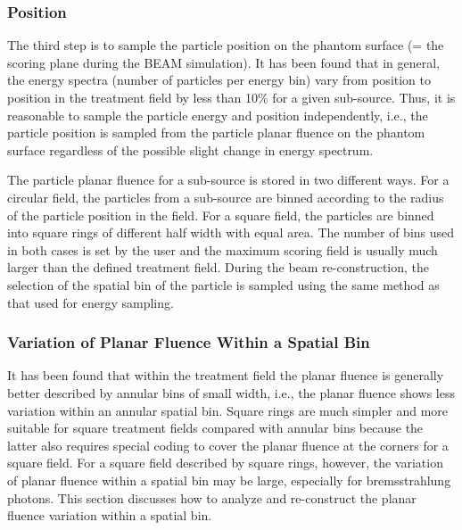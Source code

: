\documentclass[12pt,twoside]{article}
\begin{document}
\subsubsection{Position}
The third step is to sample the particle position on the phantom surface
(= the scoring plane during the BEAM simulation).  It has been found that
in general,  the energy spectra (number of particles per energy bin) vary
from position to position in the treatment field by less than 10\% for a
given sub-source. Thus, it is reasonable to sample the particle energy and
position independently, i.e., the particle position is sampled from the
particle planar fluence on the phantom surface regardless of the possible
slight change in energy spectrum.

The particle planar fluence for a sub-source is stored in two different
ways. For a circular field, the particles from a sub-source are binned
according to the radius of the particle position in the field.  For a
square field, the particles are binned into square rings of different half
width with equal area.  The number of bins used in both cases is set by
the user and the maximum scoring field is usually much larger than the
defined treatment field. During the beam re-construction, the selection of
the spatial bin of the particle is sampled using the same method as that
used for energy sampling.

\subsubsection{Variation of Planar Fluence Within a Spatial Bin}
It has been found that within the treatment field the planar fluence is
generally better described by annular bins of small width, i.e., the
planar fluence shows less variation within an annular spatial bin. Square
rings are much simpler and more suitable for square treatment fields
compared with annular bins because the latter also requires special coding
to cover the planar fluence at the corners for a square field. For a
square field described by square rings, however, the variation of planar
fluence within a spatial bin may be large, especially for bremsstrahlung
photons.  This section discusses how to analyze and re-construct the
planar fluence variation within a spatial bin.
\end{document}
